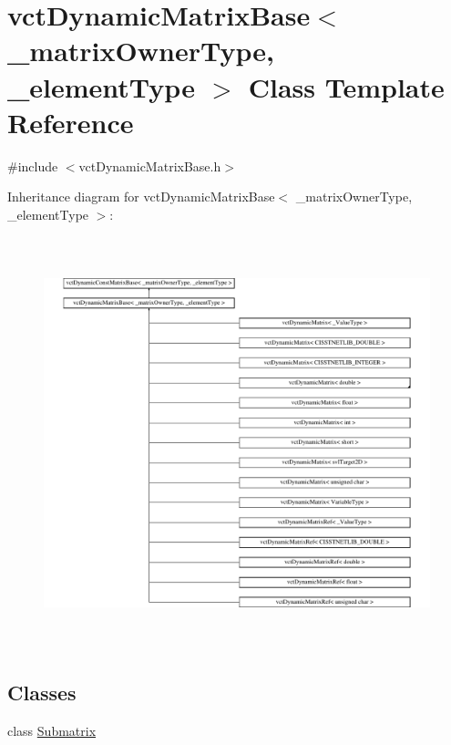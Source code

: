 \hypertarget{classvct_dynamic_matrix_base}{\section{vct\-Dynamic\-Matrix\-Base$<$ \-\_\-matrix\-Owner\-Type, \-\_\-element\-Type $>$ Class Template Reference}
\label{classvct_dynamic_matrix_base}
}


{\ttfamily \#include $<$vct\-Dynamic\-Matrix\-Base.\-h$>$}

Inheritance diagram for vct\-Dynamic\-Matrix\-Base$<$ \-\_\-matrix\-Owner\-Type, \-\_\-element\-Type $>$\-:\begin{figure}[H]
\begin{center}
\leavevmode
\includegraphics[height=11.959799cm]{d6/d56/classvct_dynamic_matrix_base}
\end{center}
\end{figure}
\subsection*{Classes}
\begin{DoxyCompactItemize}
\item 
class \hyperlink{classvct_dynamic_matrix_base_1_1_submatrix}{Submatrix}
\end{DoxyCompactItemize}
